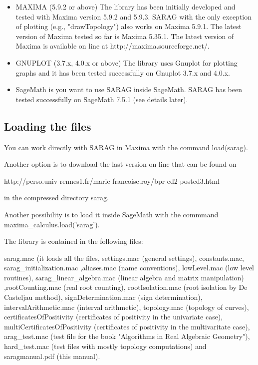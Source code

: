 \documentclass{article}
\begin{document}
\begin{itemize}
\item
  MAXIMA (5.9.2 or above) The library has been initially developed and tested
  with Maxima version 5.9.2 and 5.9.3. SARAG with the only exception of
  plotting (e.g., "drawTopology") also works on Maxima 5.9.1. The latest
  version of Maxima tested so far is Maxima 5.35.1. The latest version of
  Maxima is available on line at http://maxima.sourceforge.net/.
  \item GNUPLOT (3.7.x, 4.0.x or above) The library uses Gnuplot for plotting
  graphs and it has been tested successfully on Gnuplot 3.7.x and 4.0.x.
    \item SageMath is you want to use SARAG inside SageMath. SARAG
     has been tested successfully on SageMath 7.5.1 (see details later).
     
\end{itemize}

\subsection{Loading the files}

You can work directly with SARAG in Maxima with the command load(sarag).

Another option is to download the last version on line that can be found on

http://perso.univ-rennes1.fr/marie-francoise.roy/bpr-ed2-posted3.html

in the compressed directory sarag.

Another possibility is to load it inside SageMath with the commmand
maxima\_calculus.load('sarag').

The library is contained in the following files:

sarag.mac (it loads all the files, settings.mac (general settings),
constants.mac, sarag\_initialization.mac ,aliases.mac (name conventions),
lowLevel.mac (low level routines), sarag\_linear\_algebra.mac (linear algebra
and matrix manipulation) ,rootCounting.mac (real root counting),
rootIsolation.mac (root isolation by De Casteljau method),
signDetermination.mac (sign determination), intervalArithmetic.mac (interval
arithmetic), topology.mac (topology of curves), certificatesOfPositivity
(certificates of positivity in the univariate case),
multiCertificatesOfPositivity (certificates of positivity in the multivaritate
case), arag\_test.mac (test file for the book "Algorithms in Real Algebraic
Geometry"), hard\_test.mac (test files with mostly topology computations) and
saragmanual.pdf (this manual).
\end{document}
